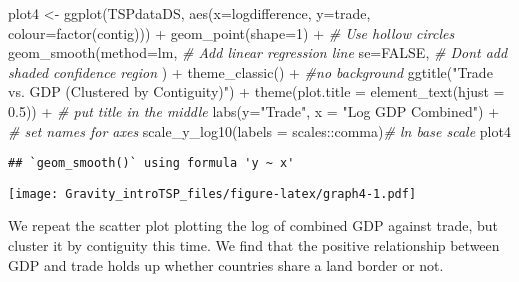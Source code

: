 \documentclass[
]{article}
\newenvironment{Shaded}{\begin{snugshade}}{\end{snugshade}}
\newcommand{\AttributeTok}[1]{\textcolor[rgb]{0.77,0.63,0.00}{#1}}
\newcommand{\CommentTok}[1]{\textcolor[rgb]{0.56,0.35,0.01}{\textit{#1}}}
\newcommand{\ConstantTok}[1]{\textcolor[rgb]{0.00,0.00,0.00}{#1}}
\newcommand{\DecValTok}[1]{\textcolor[rgb]{0.00,0.00,0.81}{#1}}
\newcommand{\FloatTok}[1]{\textcolor[rgb]{0.00,0.00,0.81}{#1}}
\newcommand{\FunctionTok}[1]{\textcolor[rgb]{0.00,0.00,0.00}{#1}}
\newcommand{\NormalTok}[1]{#1}
\newcommand{\OtherTok}[1]{\textcolor[rgb]{0.56,0.35,0.01}{#1}}
\newcommand{\SpecialCharTok}[1]{\textcolor[rgb]{0.00,0.00,0.00}{#1}}
\newcommand{\StringTok}[1]{\textcolor[rgb]{0.31,0.60,0.02}{#1}}
\begin{document}
\begin{Shaded}
\begin{Highlighting}[]
\NormalTok{plot4 }\OtherTok{\textless{}{-}} \FunctionTok{ggplot}\NormalTok{(TSPdataDS, }\FunctionTok{aes}\NormalTok{(}\AttributeTok{x=}\NormalTok{logdifference,}
                         \AttributeTok{y=}\NormalTok{trade, }\AttributeTok{colour=}\FunctionTok{factor}\NormalTok{(contig))) }\SpecialCharTok{+}
                        \FunctionTok{geom\_point}\NormalTok{(}\AttributeTok{shape=}\DecValTok{1}\NormalTok{) }\SpecialCharTok{+} \CommentTok{\# Use hollow circles}
                        \FunctionTok{geom\_smooth}\NormalTok{(}\AttributeTok{method=}\NormalTok{lm, }\CommentTok{\# Add linear regression line}
                                \AttributeTok{se=}\ConstantTok{FALSE}\NormalTok{,   }\CommentTok{\# Don\textquotesingle{}t add shaded confidence region}
\NormalTok{                                ) }\SpecialCharTok{+} 
                        \FunctionTok{theme\_classic}\NormalTok{() }\SpecialCharTok{+} \CommentTok{\#no background}
                        \FunctionTok{ggtitle}\NormalTok{(}\StringTok{"Trade vs. GDP (Clustered by Contiguity)"}\NormalTok{) }\SpecialCharTok{+}
                        \FunctionTok{theme}\NormalTok{(}\AttributeTok{plot.title =} \FunctionTok{element\_text}\NormalTok{(}\AttributeTok{hjust =} \FloatTok{0.5}\NormalTok{)) }\SpecialCharTok{+} \CommentTok{\# put title in the middle}
                        \FunctionTok{labs}\NormalTok{(}\AttributeTok{y=}\StringTok{"Trade"}\NormalTok{, }\AttributeTok{x =} \StringTok{"Log GDP Combined"}\NormalTok{) }\SpecialCharTok{+} \CommentTok{\# set names for axes}
                        \FunctionTok{scale\_y\_log10}\NormalTok{(}\AttributeTok{labels =}\NormalTok{ scales}\SpecialCharTok{::}\NormalTok{comma)}\CommentTok{\# ln base scale}
\NormalTok{plot4}
\end{Highlighting}
\end{Shaded}

\begin{verbatim}
## `geom_smooth()` using formula 'y ~ x'
\end{verbatim}

\texttt{[image: Gravity\_introTSP\_files/figure-latex/graph4-1.pdf]}

We repeat the scatter plot plotting the log of combined GDP against
trade, but cluster it by contiguity this time. We find that the positive
relationship between GDP and trade holds up whether countries share a
land border or not.
\end{document}
